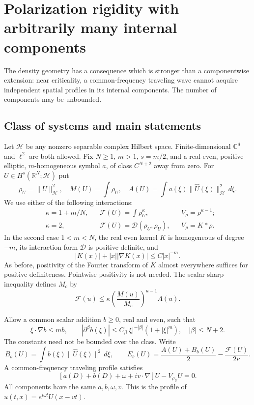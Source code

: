 \section{Polarization rigidity with arbitrarily many internal components}
\label{sec:r11-systems}

The density geometry has a consequence which is stronger than a
componentwise extension: near criticality, a common-frequency traveling
wave cannot acquire independent spatial profiles in its internal
components. The number of components may be unbounded.

\subsection{Class of systems and main statements}
Let $\mathcal H$ be any nonzero separable complex Hilbert space.
Finite-dimensional $\mathbb C^d$ and $\ell^2$ are both allowed.
Fix $N\ge1$, $m>1$, $s=m/2$, and a real-even, positive elliptic,
$m$-homogeneous symbol $a$, of class $C^{N+2}$ away from zero.
For $U\in H^s(\mathbb R^N;\mathcal H)$ put
\[
 \rho_U=\|U\|_{\mathcal H}^2,\quad
 M(U)=\int\rho_U,\quad
 A(U)=\int a(\xi)\|\widehat U(\xi)\|_{\mathcal H}^2\,d\xi.
\]
We use either of the following interactions:
\begin{align*}
 &\kappa=1+m/N,
 &&\mathcal F(U)=\int\rho_U^\kappa,
 &&V_\rho=\rho^{\kappa-1};\\
 &\kappa=2,
 &&\mathcal F(U)=\mathcal D(\rho_U,\rho_U),
 &&V_\rho=K*\rho.
\end{align*}
In the second case $1<m<N$, the real even kernel $K$ is homogeneous
of degree $-m$, its interaction form $\mathcal D$ is positive definite,
and
\[
 |K(x)|+|x||\nabla K(x)|\le C|x|^{-m}.
\]
As before, positivity of the Fourier transform of $K$ almost everywhere
suffices for positive definiteness. Pointwise positivity is not needed.
The scalar sharp inequality defines $M_c$ by
\begin{equation}\label{eq:r11-vectorGN}
 \mathcal F(u)\le\kappa
       \left(\frac{M(u)}{M_c}\right)^{\kappa-1}A(u).
\end{equation}

Allow a common scalar addition $b\ge0$, real and even, such that
\begin{equation}\label{eq:r11-vectorcone}
 \xi\cdot\nabla b\le mb,\qquad
 |\partial^\beta b(\xi)|\le C_\beta|\xi|^{-|\beta|}(1+|\xi|^m),
 \quad |\beta|\le N+2.
\end{equation}
The constants need not be bounded over the class. Write
\[
 B_b(U)=\int b(\xi)\|\widehat U(\xi)\|^2\,d\xi,
 \qquad E_b(U)=\frac{A(U)+B_b(U)}2-\frac{\mathcal F(U)}{2\kappa}.
\]
A common-frequency traveling profile satisfies
\begin{equation}\label{eq:r11-vectorprofile}
 [a(D)+b(D)+\omega+iv\cdot\nabla]U-V_{\rho_U}U=0.
\end{equation}
All components have the same $a,b,\omega,v$. This is the profile
of $u(t,x)=e^{i\omega t}U(x-vt)$.

